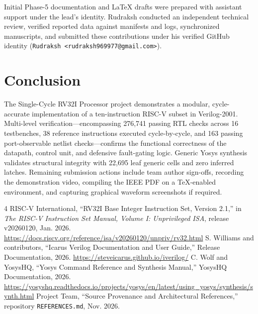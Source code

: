 \documentclass[conference]{IEEEtran}
\begin{document}
Initial Phase-5 documentation and LaTeX drafts were prepared with assistant support under the lead's identity. Rudraksh conducted an independent technical review, verified reported data against manifests and logs, synchronized manuscripts, and submitted these contributions under his verified GitHub identity (\texttt{Rudraksh <rudraksh969977@gmail.com>}).

\section{Conclusion}
The Single-Cycle RV32I Processor project demonstrates a modular, cycle-accurate implementation of a ten-instruction RISC-V subset in Verilog-2001. Multi-level verification—encompassing 276,741 passing RTL checks across 16 testbenches, 38 reference instructions executed cycle-by-cycle, and 163 passing port-observable netlist checks—confirms the functional correctness of the datapath, control unit, and defensive fault-gating logic. Generic Yosys synthesis validates structural integrity with 22,695 leaf generic cells and zero inferred latches. Remaining submission actions include team author sign-offs, recording the demonstration video, compiling the IEEE PDF on a TeX-enabled environment, and capturing graphical waveform screenshots if required.

\begin{thebibliography}{4}
 RISC-V International, ``RV32I Base Integer Instruction Set, Version 2.1,'' in \emph{The RISC-V Instruction Set Manual, Volume I: Unprivileged ISA}, release v20260120, Jan. 2026. \url{https://docs.riscv.org/reference/isa/v20260120/unpriv/rv32.html}
 S. Williams and contributors, ``Icarus Verilog Documentation and User Guide,'' Release Documentation, 2026. \url{https://steveicarus.github.io/iverilog/}
 C. Wolf and YosysHQ, ``Yosys Command Reference and Synthesis Manual,'' YosysHQ Documentation, 2026. \url{https://yosyshq.readthedocs.io/projects/yosys/en/latest/using_yosys/synthesis/synth.html}
 Project Team, ``Source Provenance and Architectural References,'' repository \texttt{REFERENCES.md}, Nov. 2026.
\end{thebibliography}
\end{document}
